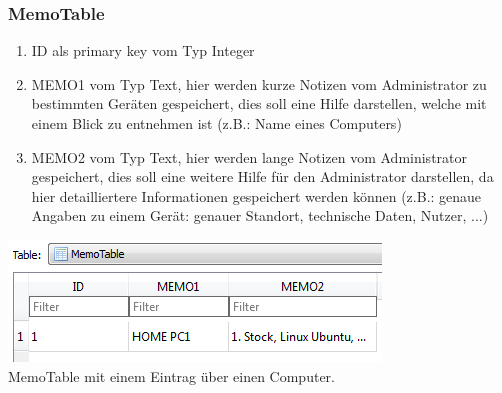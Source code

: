 \documentclass[12pt,a4paper]{report}
\begin{document}
\begin{onehalfspace}
\subsubsection{MemoTable}
\begin{enumerate}
\item ID als primary key vom Typ Integer
\item MEMO1 vom Typ Text, hier werden kurze Notizen vom Administrator zu bestimmten Geräten gespeichert, dies soll eine Hilfe darstellen, welche mit einem Blick zu entnehmen ist (z.B.: Name eines Computers)
\item MEMO2 vom Typ Text, hier werden lange Notizen vom Administrator gespeichert, dies soll eine weitere Hilfe für den Administrator darstellen, da hier detailliertere Informationen gespeichert werden können (z.B.: genaue Angaben zu einem Gerät: genauer Standort, technische Daten, Nutzer, ...)
\end{enumerate}
\begin{center}
\includegraphics[scale=0.8]{img/db-tb-memo.png}\\
MemoTable mit einem Eintrag über einen Computer.
\end{center}

\end{onehalfspace}
\end{document}

